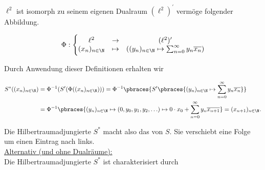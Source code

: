 \begin{solution}
\begin{itemize}
  \begin{center}
   \\
  \end{center}

  $\ell^2$ ist isomorph zu seinem eigenen Dualraum $(\ell^2)^\prime$ vermöge folgender Abbildung.

  \begin{align*}
    \Phi: \Bigg \{
    \begin{matrix}
      \ell^2             &
      \rightarrow        &
      (\ell^2)^\prime \\
      (x_n)_{n \in \N}   &
      \mapsto            &
      ((y_n)_{n \in \N} \mapsto \sum_{n=0}^\infty y_n \overline{x_n})
    \end{matrix}
  \end{align*}

  Durch Anwendung dieser Definitionen erhalten wir

  \begin{align*}
    S^\ast((x_n)_{n \in \N})
    & =
    \Phi^{-1}(S^\prime(\Phi((x_n)_{n \in \N})))
    =
    \Phi^{-1} \pbraces
    {
      S^\prime \pbraces
      {
        (y_n)_{n \in \N}
        \mapsto
        \sum_{n=0}^\infty
        y_n \overline{x_n}
      }
    } \\
    & =
    \Phi^{-1} \pbraces
    {
      (y_n)_{n \in \N}
      \mapsto
      (0, y_0, y_1, y_2, \ldots)
      \mapsto
      0 \cdot x_0 +
      \sum_{n=0}^\infty
      y_n \overline{x_{n+1}}
    }
    =
    (x_{n+1})_{n \in \N}.
  \end{align*}

  Die Hilbertraumadjungierte $S^\ast$ macht also das  von $S$.
  Sie verschiebt eine Folge um einen Eintrag nach links. \\

  \underline{Alternativ (und ohne Dualräume):} \\

  Die Hilbertraumadjungierte $S^\ast$ ist charakterisiert durch


\end{itemize}
\end{solution}
